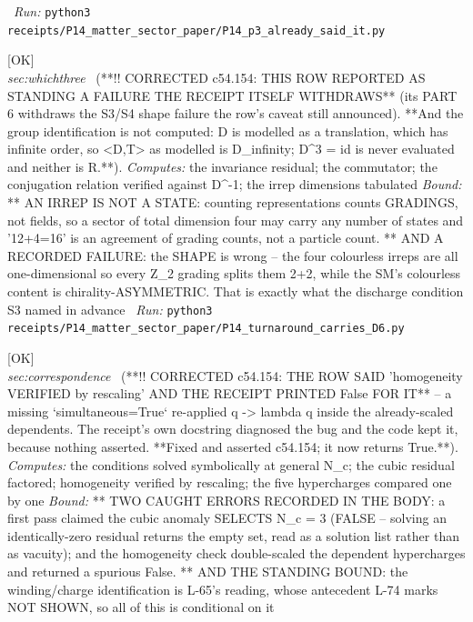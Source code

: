 \begin{description}
\ \emph{Run:} \texttt{python3 receipts/P14\_matter\_sector\_paper/P14\_p3\_already\_said\_it.py}
\item[\rcptlabel{P14_turnaround_carries_D6}{P14R45}\textbf{P14R45}\quad\texttt{P14\_turnaround\_carries\_D6}]\hfill\textsf{[OK]}\\
\textit{sec:whichthree} \ (**!! CORRECTED c54.154: THIS ROW REPORTED AS STANDING A FAILURE THE RECEIPT ITSELF WITHDRAWS** (its PART 6 withdraws the S3/S4 shape failure the row's caveat still announced). **And the group identification is not computed: D is modelled as a translation, which has infinite order, so <D,T> as modelled is D\_infinity; D\textasciicircum{}3 = id is never evaluated and neither is R.**). 
\emph{Computes:} the invariance residual; the commutator; the conjugation relation verified against D\textasciicircum{}-1; the irrep dimensions tabulated
 \emph{Bound:} ** AN IRREP IS NOT A STATE: counting representations counts GRADINGS, not fields, so a sector of total dimension four may carry any number of states and '12+4=16' is an agreement of grading counts, not a particle count. ** AND A RECORDED FAILURE: the SHAPE is wrong -- the four colourless irreps are all one-dimensional so every Z\_2 grading splits them 2+2, while the SM's colourless content is chirality-ASYMMETRIC. That is exactly what the discharge condition S3 named in advance
\ \emph{Run:} \texttt{python3 receipts/P14\_matter\_sector\_paper/P14\_turnaround\_carries\_D6.py}
\item[\rcptlabel{P14_scale_and_ratio}{P14R46}\textbf{P14R46}\quad\texttt{P14\_scale\_and\_ratio}]\hfill\textsf{[OK]}\\
\textit{sec:correspondence} \ (**!! CORRECTED c54.154: THE ROW SAID 'homogeneity VERIFIED by rescaling' AND THE RECEIPT PRINTED False FOR IT** -- a missing `simultaneous=True` re-applied q -> lambda q inside the already-scaled dependents. The receipt's own docstring diagnosed the bug and the code kept it, because nothing asserted. **Fixed and asserted c54.154; it now returns True.**). 
\emph{Computes:} the conditions solved symbolically at general N\_c; the cubic residual factored; homogeneity verified by rescaling; the five hypercharges compared one by one
 \emph{Bound:} ** TWO CAUGHT ERRORS RECORDED IN THE BODY: a first pass claimed the cubic anomaly SELECTS N\_c = 3 (FALSE -- solving an identically-zero residual returns the empty set, read as a solution list rather than as vacuity); and the homogeneity check double-scaled the dependent hypercharges and returned a spurious False. ** AND THE STANDING BOUND: the winding/charge identification is L-65's reading, whose antecedent L-74 marks NOT SHOWN, so all of this is conditional on it

\end{description}
